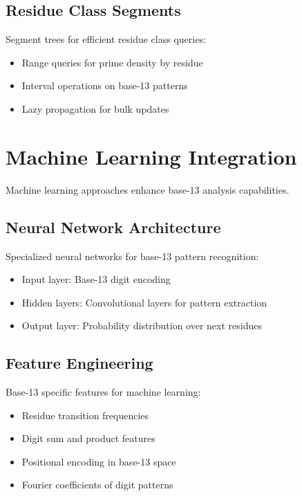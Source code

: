 \documentclass[12pt,a4paper]{report}
\begin{document}
\subsection{Residue Class Segments}

Segment trees for efficient residue class queries:

\begin{itemize}
\item Range queries for prime density by residue
\item Interval operations on base-13 patterns
\item Lazy propagation for bulk updates
\end{itemize}

\section{Machine Learning Integration}

Machine learning approaches enhance base-13 analysis capabilities.

\subsection{Neural Network Architecture}

Specialized neural networks for base-13 pattern recognition:

\begin{itemize}
\item Input layer: Base-13 digit encoding
\item Hidden layers: Convolutional layers for pattern extraction
\item Output layer: Probability distribution over next residues
\end{itemize}

\subsection{Feature Engineering}

Base-13 specific features for machine learning:

\begin{itemize}
\item Residue transition frequencies
\item Digit sum and product features
\item Positional encoding in base-13 space
\item Fourier coefficients of digit patterns
\end{itemize}
\end{document}
